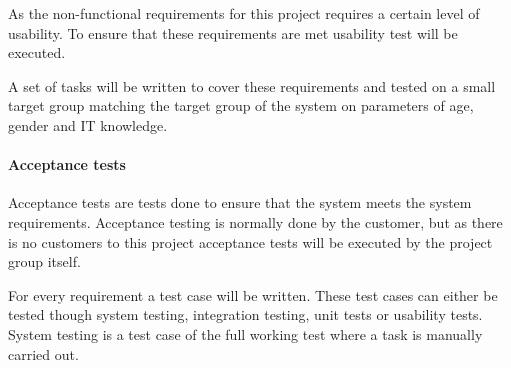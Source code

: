 \documentclass[../report.tex]{subfiles}
\begin{document}
As the non-functional requirements for this project requires a certain level of usability. To ensure that these requirements are met usability test will be executed.

A set of tasks will be written to cover these requirements and tested on a small target group matching the target group of the system on parameters of age, gender and IT knowledge.

\paragraph{Acceptance tests}

Acceptance tests are tests done to ensure that the system meets the system requirements. Acceptance testing is normally done by the customer, but as there is no customers to this project acceptance tests will be executed by the project group itself.

For every requirement a test case will be written. These test cases can either be tested though system testing, integration testing, unit tests or usability tests. System testing is a test case of the full working test where a task is manually carried out. 
\end{document}
